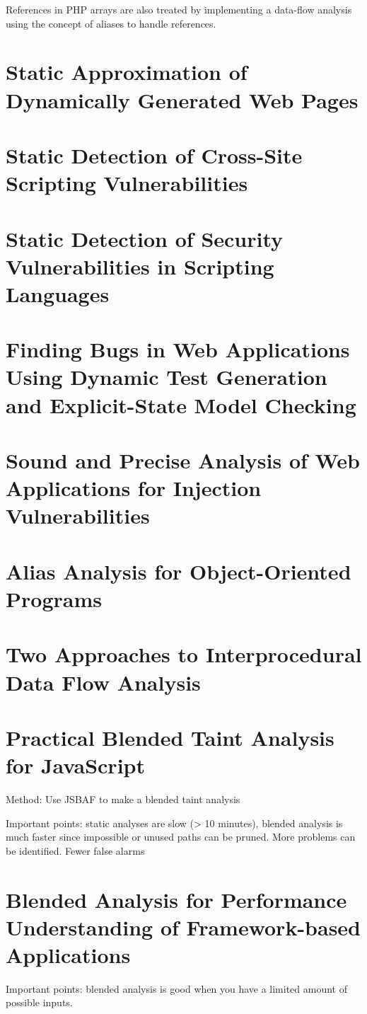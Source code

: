 References in PHP arrays are also treated by  implementing a data-flow analysis using the concept of aliases to handle references.

\section{Static Approximation of Dynamically Generated Web Pages}

\section{Static Detection of Cross-Site Scripting Vulnerabilities}

\section{Static Detection of Security Vulnerabilities in Scripting Languages}

\section{Finding Bugs in Web Applications Using Dynamic Test Generation and Explicit-State Model Checking}

\section{Sound and Precise Analysis of Web Applications for Injection Vulnerabilities}

\section{Alias Analysis for Object-Oriented Programs}

\section{Two Approaches to Interprocedural Data Flow Analysis}

\section{Practical Blended Taint Analysis for JavaScript}
Method: Use JSBAF to make a blended taint analysis

Important points: static analyses are slow (> 10 minutes), blended analysis is much faster since impossible or unused paths can be pruned. More problems can be identified. Fewer false alarms

\section{Blended Analysis for Performance Understanding of Framework-based Applications}
Important points: blended analysis is good when you have a limited amount of possible inputs.
